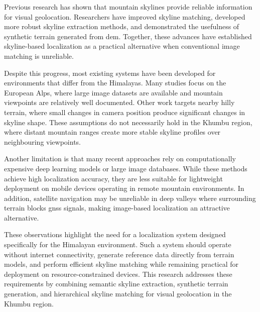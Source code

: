Previous research has shown that mountain skylines provide reliable information for visual geolocation. Researchers have improved skyline matching, developed more robust skyline extraction methods, and demonstrated the usefulness of synthetic terrain generated from \Gls{dem}. Together, these advances have established skyline-based localization as a practical alternative when conventional image matching is unreliable.

Despite this progress, most existing systems have been developed for environments that differ from the Himalayas. Many studies focus on the European Alps, where large image datasets are available and mountain viewpoints are relatively well documented. Other work targets nearby hilly terrain, where small changes in camera position produce significant changes in skyline shape. These assumptions do not necessarily hold in the Khumbu region, where distant mountain ranges create more stable skyline profiles over neighbouring viewpoints.

Another limitation is that many recent approaches rely on computationally expensive deep learning models or large image databases. While these methods achieve high localization accuracy, they are less suitable for lightweight deployment on mobile devices operating in remote mountain environments. In addition, satellite navigation may be unreliable in deep valleys where surrounding terrain blocks \Gls{gnss} signals, making image-based localization an attractive alternative.

These observations highlight the need for a localization system designed specifically for the Himalayan environment. Such a system should operate without internet connectivity, generate reference data directly from terrain models, and perform efficient skyline matching while remaining practical for deployment on resource-constrained devices. This research addresses these requirements by combining semantic skyline extraction, synthetic terrain generation, and hierarchical skyline matching for visual geolocation in the Khumbu region.
